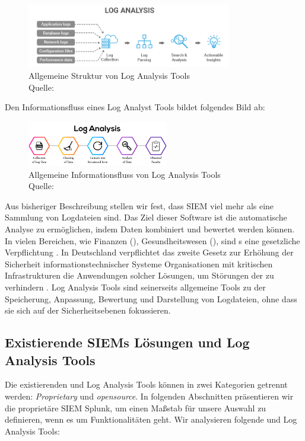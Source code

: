 \begin{figure}[H]
   \centering
   \includegraphics[width=0.8\textwidth]{assets/2.1_p2.png}
   \caption{Allgemeine Struktur von Log Analysis Tools\\Quelle: \citep{Tek-Tools_LGTArchitektur} }
   \centering
\end{figure}

Den Informationsfluss eines Log Analyst Tools bildet folgendes Bild ab:

\begin{figure}[H]
   \centering
   \includegraphics[width=0.55\textwidth]{assets/2.2_p2.png}
   \caption{Allgemeine Informationsfluss von Log Analysis Tools\\Quelle: \citep{Neptune_LATInfoFluss} }
   \centering
\end{figure}

Aus bisheriger Beschreibung stellen wir fest, dass \gls{SIEM} viel mehr als eine Sammlung von Logdateien sind. Das Ziel dieser Software ist die automatische Analyse zu ermöglichen, indem Daten kombiniert und bewertet werden können. In vielen Bereichen, wie Finanzen (), Gesundheitswesen (), sind s eine gesetzliche Verpflichtung \citep{Jog_SIEM}. In Deutschland verpflichtet das zweite Gesetz zur Erhöhung der Sicherheit informationstechnischer Systeme Organisationen mit kritischen Infrastrukturen die Anwendungen solcher Lösungen, um Störungen der  zu verhindern \citep{BSI_ITSG}. Log Analysis Tools sind seinerseits allgemeine Tools zu der Speicherung, Anpassung, Bewertung und Darstellung von Logdateien, ohne dass sie sich auf der Sicherheitsebenen fokussieren.



\subsection{Existierende SIEMs Lösungen und Log Analysis Tools}
Die existierenden  und Log Analysis Tools können in zwei Kategorien getrennt werden: \textit{\gls{Proprietary}} und  \textit{\gls{opensource}}. In folgenden Abschnitten präsentieren wir die proprietäre \gls{SIEM} Splunk, um einen Maßstab für unsere Auswahl zu definieren, wenn es um Funktionalitäten geht. Wir analysieren folgende  und Log Analysis Tools: 

